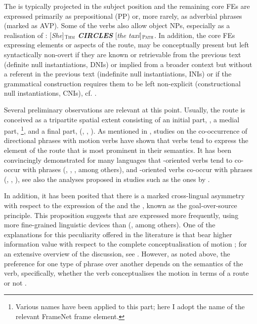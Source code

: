 \documentclass[output=paper,colorlinks,citecolor=brown]{langscibook}
\begin{document}
The  is typically projected in the subject position and the remaining core FEs are expressed primarily as prepositional (PP) or, more rarely, as adverbial phrases (marked as AVP). Some of the verbs also allow object NPs, especially as a realisation of : [\textit{She}]$_{\text{\textsc{Thm}}}$ \textit{\uppercase{\textbf{circles}}} [\textit{the taxi}]$_{\text{\textsc{Path}}}$. In addition, the core FEs expressing elements or aspects of the route, may be conceptually present but left syntactically non-overt if they are known or retrievable from the previous text (definite null instantiations, DNIs) or implied from a broader context but without a referent in the previous text (indefinite null instantiations, INIs) or if the grammatical construction requires them to be left non-explicit (constructional null instantiations, CNIs), cf. \citep[28--30]{Ruppenhofer2016}. 

Several preliminary observations are relevant at this point. Usually, the route is conceived as a tripartite spatial extent consisting of an initial part, , a medial part, \footnote{Various names have been applied to this part; here I adopt the name of the relevant FrameNet frame element.}, and a final part,  (\cite[162]{Jackendoff1983}, \cite[57]{Talmy1985}, \cite[275]{Lakoff1987}). As mentioned in , studies on the co-occurrence of directional phrases with motion verbs have shown that verbs tend to express the element of the route that is most prominent in their semantics. It has been convincingly demonstrated for many languages that -oriented verbs tend to co-occur with  phrases (\cite[22--24]{Rakhilina2004}, \cite[255-257]{StefanowitschRohde2004}, \cite[174--178]{Taremaa2017}, among others), and -oriented verbs co-occur with  phrases (\cite[22--23]{Rakhilina2004}, \cite[255-257]{StefanowitschRohde2004}, \cite[160--164]{Taremaa2017}), see also the analyses proposed in studies such as the ones by \citet{Cristobal2010,Kopecka2010}. %

In addition, it has been posited that there is a marked cross-lingual asymmetry with respect to the expression of the  and the , known as the goal-over-source principle. This proposition suggests that  are expressed more frequently, using more fine-grained linguistic devices than  (\cite{Ikegami1987,WalchliZuniga2006,Verkerk2017}, among others). One of the explanations for this peculiarity offered in the literature is that  bear higher information value with respect to the complete conceptualisation of motion \citep[249]{StefanowitschRohde2004}; for an extensive overview of the discussion, see \citet{Verkerk2017}. However, as noted above, the preference for one type of phrase over another depends on the semantics of the verb, specifically, whether the verb conceptualises the motion in terms of a route or not \citep{StefanowitschRohde2004}. 
\end{document}
